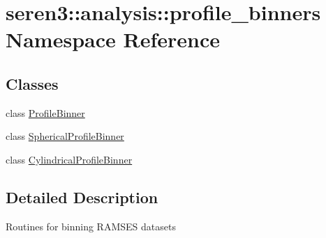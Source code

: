 \hypertarget{namespaceseren3_1_1analysis_1_1profile__binners}{
\section{seren3::analysis::profile\_\-binners Namespace Reference}
\label{namespaceseren3_1_1analysis_1_1profile__binners}
}
\subsection*{Classes}
\begin{DoxyCompactItemize}
\item 
class \hyperlink{classseren3_1_1analysis_1_1profile__binners_1_1ProfileBinner}{ProfileBinner}
\item 
class \hyperlink{classseren3_1_1analysis_1_1profile__binners_1_1SphericalProfileBinner}{SphericalProfileBinner}
\item 
class \hyperlink{classseren3_1_1analysis_1_1profile__binners_1_1CylindricalProfileBinner}{CylindricalProfileBinner}
\end{DoxyCompactItemize}


\subsection{Detailed Description}
\begin{DoxyVerb}
Routines for binning RAMSES datasets
\end{DoxyVerb}
 